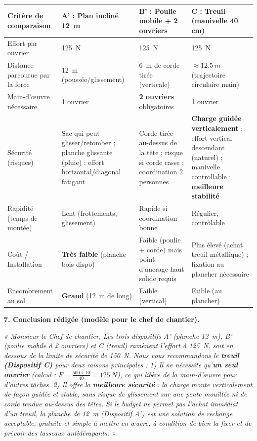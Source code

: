 \documentclass[11pt]{article}
\begin{document}
\begin{exoresolu}
\begin{center}
\begin{tabularx}{\linewidth}{|l|X|X|X|}
\hline
\rowcolor{popblueL} \textbf{Critère de comparaison} & \textbf{A' : Plan incliné \SI{12}{m}} & \textbf{B' : Poulie mobile + 2 ouvriers} & \textbf{C : Treuil (manivelle 40 cm)} \\
\hline
Effort par ouvrier & \SI{125}{N} & \SI{125}{N} & \SI{125}{N} \\
\hline
Distance parcourue par la force & \SI{12}{m} (poussée/glissement) & \SI{6}{m} de corde tirée (verticale) & $\approx \SI{12,5}{m}$ (trajectoire circulaire main) \\
\hline
Main-d'œuvre nécessaire & 1 ouvrier & \textbf{2 ouvriers} obligatoires & 1 ouvrier \\
\hline
Sécurité (risques) & Sac qui peut glisser/retomber ; planche glissante (pluie) ; effort horizontal/diagonal fatigant & Corde tirée au-dessus de la tête ; risque si corde casse ; coordination 2 personnes & \textbf{Charge guidée verticalement} ; effort vertical descendant (naturel) ; manivelle controllable ; \textbf{meilleure stabilité} \\
\hline
Rapidité (temps de montée) & Lent (frottements, glissement) & Rapide si coordination bonne & Régulier, contrôlable \\
\hline
Coût / Installation & \textbf{Très faible} (planche bois dispo) & Faible (poulie + corde) mais point d'ancrage haut solide requis & Plus élevé (achat treuil métallique) ; fixation au plancher nécessaire \\
\hline
Encombrement au sol & \textbf{Grand} (\SI{12}{m} de long) & Faible (vertical) & Faible (au plancher) \\
\hline
\end{tabularx}
\end{center}

\textbf{7. Conclusion rédigée (modèle pour le chef de chantier).}

\emph{« Monsieur le Chef de chantier,}
\emph{Les trois dispositifs A' (planche \SI{12}{m}), B' (poulie mobile à 2 ouvriers) et C (treuil) ramènent l'effort à \SI{125}{N}, soit en dessous de la limite de sécurité de \SI{150}{N}. Nous vous recommandons le \textbf{treuil (Dispositif C)} pour deux raisons principales :}
\emph{1) Il ne nécessite qu'\textbf{un seul ouvrier} (calcul : $F = \frac{500 \times 10}{40} = \SI{125}{N}$), ce qui libère de la main-d'œuvre pour d'autres tâches.}
\emph{2) Il offre la \textbf{meilleure sécurité} : la charge monte verticalement de façon guidée et stable, sans risque de glissement sur une pente mouillée ni de corde tendue au-dessus des têtes.}
\emph{Si le budget ne permet pas l'achat immédiat d'un treuil, la planche de \SI{12}{m} (Dispositif A') est une solution de rechange acceptable, gratuite et simple à mettre en œuvre, à condition de bien la fixer et de prévoir des tasseaux antidérapants. »}


\end{exoresolu}
\end{document}
